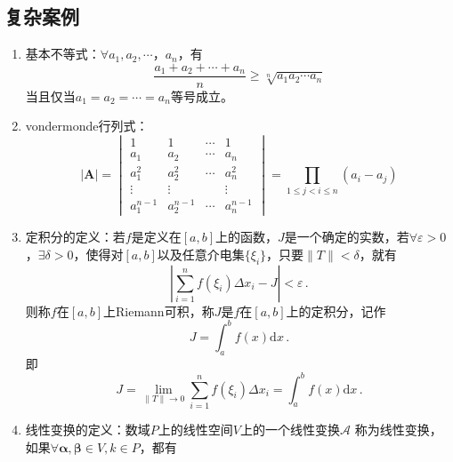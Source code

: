 \documentclass[draft,14pt]{extarticle}%
\begin{document}
\subsection{复杂案例}
\begin{enumerate}
    \item 基本不等式：$\forall a_1,a_2,\cdots，a_n$，有%
    \begin{equation*}
        \frac{a_1+a_2+\cdots+a_n}{n}\geq\sqrt[n]{a_1a_2\cdots a_n}%
    \end{equation*}
    当且仅当$a_1=a_2=\cdots=a_n$等号成立。
    \item vondermonde行列式：
    \begin{equation*}
        |\bm{A}|=\begin{vmatrix}%
        1 & 1&\cdots&1\\
        a_1&a_2&\cdots&a_n\\
        a_1^2 &a_2^2 &\cdots &a_n^2\\
        \vdots &\vdots & &\vdots\\
        a_1^{n-1} & a_2^{n-1} &\cdots &a_n^{n-1}
        \end{vmatrix}
        =\prod_{1\leq j<i\leq n }(a_i-a_j)%
    \end{equation*}
    \item 定积分的定义：若$f$是定义在$[a,b]$上的函数，$J$是一个确定的实数，若$\forall \varepsilon >0$，$\exists \delta>0$，使得对$[a,b]$以及任意介电集$\{\xi_i\}$，只要$\|T\|<\delta$，就有
    \begin{equation*}
        \left|\sum_{i=1}^nf(\xi_i)\Delta x_i-J\right|<\varepsilon\,.
    \end{equation*}
    则称$f$在$[a,b]$上Riemann可积，称$J$是$f$在$[a,b]$上的定积分，记作
    \begin{equation*}
        J=\int_a^bf(x)\mathrm{d}x\,.
    \end{equation*}
    即
    \begin{equation*}
        J=\lim_{\|T\| \to 0}\sum_{i=1}^nf(\xi_i)\Delta x_i=\int _a^bf(x)\mathrm{d}x\,.%
    \end{equation*}
    \item 线性变换的定义：数域$P$上的线性空间$V$上的一个线性变换$\mathscr{A}$ 称为线性变换，如果$\forall\bm\alpha ,\bm\beta \in V,k\in P$，都有

\end{enumerate}
\end{document}
